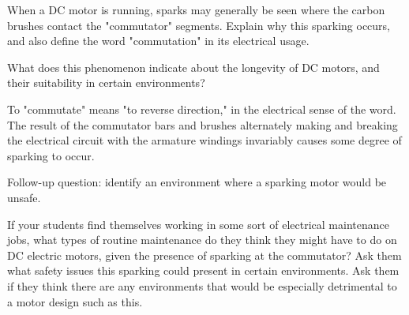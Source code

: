 

When a DC motor is running, sparks may generally be seen where the carbon brushes contact the "commutator" segments.  Explain why this sparking occurs, and also define the word "commutation" in its electrical usage.

What does this phenomenon indicate about the longevity of DC motors, and their suitability in certain environments?







To "commutate" means "to reverse direction," in the electrical sense of the word.  The result of the commutator bars and brushes alternately making and breaking the electrical circuit with the armature windings invariably causes some degree of sparking to occur.

\vskip 10pt

Follow-up question: identify an environment where a sparking motor would be unsafe.







If your students find themselves working in some sort of electrical maintenance jobs, what types of routine maintenance do they think they might have to do on DC electric motors, given the presence of sparking at the commutator?  Ask them what safety issues this sparking could present in certain environments.  Ask them if they think there are any environments that would be especially detrimental to a motor design such as this.





